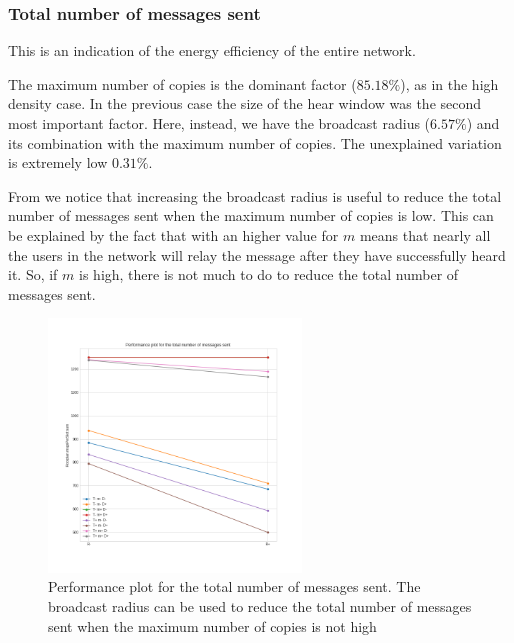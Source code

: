 \subsubsection{Total number of messages sent}\label{subsubsec:ld2krmessages}

This is an indication of the energy efficiency of the entire network.

The maximum number of copies is the dominant factor (\(85.18\%\)), as in the
high density case. In the previous case the size of the hear window was the
second most important factor. Here, instead, we have the broadcast radius
(\(6.57\%\)) and its combination with the maximum number of copies. The
unexplained variation is extremely low \(0.31\%\).

From  we notice that increasing the broadcast radius
is useful to reduce the total number of messages sent when the maximum number of
copies is low. This can be explained by the fact that with an higher value for
\(m\) means that nearly all the users in the network will relay the message
after they have successfully heard it. So, if \(m\) is high, there is not much
to do to reduce the total number of messages sent.

\begin{figure}[htb]
	\centering
	\includegraphics[width=0.6\textwidth]{img/ld/messages-R-perfplot}
	\caption{Performance plot for the total number of messages sent. The
	broadcast radius can be used to reduce the total number of messages sent
	when the maximum number of copies is not
	high}\label{fig:ldperfmessagesR}
\end{figure}
